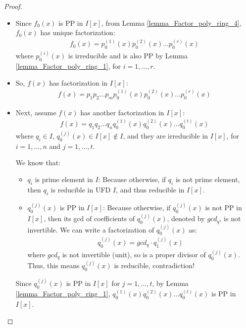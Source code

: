\documentclass[utf8]{ctexbook}
\begin{document}
\begin{proof}
\begin{enumerate}
{\begin{itemize}
{Since $d \in I$, $d$ is not invertible and $d\neq 0$, by $I$ is UFD, $d$ has unique factorization:
\begin{align*}
d = p_1 p_2 \ldots p_m
\end{align*}
where $p_i$ is prime element of $I$, $i=1, \ldots, m$.
}
\item{
Since $f_0 (x)$ is PP in $I[x]$, from Lemma \ref{lemma_Factor_poly_ring_4}, $f_0 (x)$ has unique factorization:
\begin{align*}
f_0 (x) = p_0 ^{(1)} (x) p_0 ^{(2)} (x) \ldots p_0 ^{(r)} (x) 
\end{align*}
where $p_0 ^{(i)} (x) $ is irreducible and is also PP by Lemma \ref{lemma_Factor_poly_ring_1}, for $i= 1, \ldots, r$.
}
\item{
So, $f(x)$ has factorization in $I[x]$:
\begin{align*}
f(x) = p_1 p_2 \ldots p_m p_0 ^{(1)} (x) p_0 ^{(2)} (x) \ldots p_0 ^{(r)} (x) 
\end{align*}
}
\item{Next, assume $f(x)$ has another factorization in $I[x]$:
\begin{align*}
f(x) = q_1 q_2 \ldots q_n q_0 ^{(1)} (x) q_0 ^{(2)} (x) \ldots q_0 ^{(t)} (x) 
\end{align*}
where $q_i \in I$, $q_0 ^{(j)} (x) \in I[x] \not \in I $, and they are irreducible in $I[x]$, for $i = 1, \ldots, n$ and $j = 1, \ldots, t$.

We know that:
\begin{itemize}
\item{$q_i$ is prime element in $I$: Because otherwise, if $q_i$ is not prime element, then $q_i$ is reducible in UFD $I$, and thus reducible in $I[x]$.}
\item{$q_0 ^{(j)} (x)$ is PP in $I[x]$: Because otherwise, if $q_0 ^{(j)} (x)$ is not PP in $I[x]$, then its gcd of coefficients of $ q_0 ^{(j)} (x)$, denoted by $ gcd_q $, is not invertible. We can write a factorization of $q_0 ^{(j)} (x)$ as:
\begin{align*}
q_0 ^{(j)} (x) = gcd_q \cdot q_1 ^{(j)} (x)
\end{align*}
where $ gcd_q $ is not invertible (unit), so is a proper divisor of $q_0 ^{(j)} (x)$. Thus, this means $q_0 ^{(j)} (x)$ is reducible, contradiction!
}
\end{itemize}

Since $q_0 ^{(j)} (x)$ is PP in $I[x]$ for $j = 1, \ldots, t$, by Lemma \ref{lemma_Factor_poly_ring_1}, $q_0 ^{(1)} (x) q_0 ^{(2)} (x) \ldots q_0 ^{(t)} (x) $ is PP in $I[x]$.

}
\end{itemize}}
\end{enumerate}
\end{proof}
\end{document}
